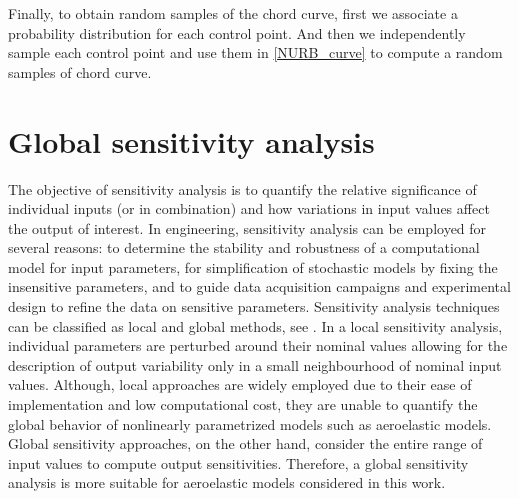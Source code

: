 \documentclass[review]{elsarticle}
\numberwithin{equation}{section}
\numberwithin{equation}{section}
\begin{document}
Finally, to obtain random samples of the chord curve, first we associate a probability distribution for each control point. And then we independently sample each control point and use them in \eqref{NURB_curve} to compute a random samples of chord curve. 

\section{Global sensitivity analysis}\label{sec:GSA}
The objective of sensitivity analysis is to quantify the relative significance of individual inputs (or in combination) and how variations in input values affect the output of interest. In engineering, sensitivity analysis can be employed for several reasons: to determine the stability and robustness of a computational model for input parameters, for simplification of stochastic models by fixing the insensitive parameters, and to guide data acquisition campaigns and experimental design to refine the data on sensitive parameters. Sensitivity analysis techniques can be classified as local and global methods, see \cite{RSmith}. In a local sensitivity analysis, individual parameters are perturbed around their nominal values allowing for the description of output variability only in a small neighbourhood of nominal input values. Although, local approaches are widely employed due to their ease of implementation and low computational cost, they are unable to quantify the global behavior of nonlinearly parametrized models such as aeroelastic models. Global sensitivity approaches, on the other hand, consider the entire range of input values to compute output sensitivities. Therefore, a global sensitivity analysis is more suitable for aeroelastic models considered in this work.  
\end{document}
